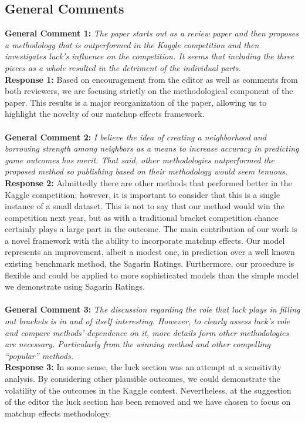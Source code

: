 \documentclass[11pt]{article} %
\begin{document}
\subsection*{General Comments}
{\bf General Comment 1:} \emph{The paper starts out as a review paper and then proposes a methodology that is outperformed in the Kaggle competition and then investigates luck's influence on the competition. It seems that including the three pieces as a whole resulted in the detriment of the individual parts.}\\
{\bf Response 1:} Based on encouragement from the editor as well as comments from both reviewers, we are focusing strictly on the methodological component of the paper. This results is a major reorganization of the paper, allowing us to highlight the novelty of our matchup effects framework.\\
\\
{\bf General Comment 2:} \emph{I believe the idea of creating a neighborhood and borrowing strength among neighbors as a means to increase accuracy in predicting game outcomes has merit. That said, other methodologies outperformed the proposed method so publishing based on their methodology would seem tenuous.}\\
{\bf Response 2:} Admittedly there are other methods that performed better in the Kaggle competition; however, it is important to consider that this is a single instance of a small dataset. This is not to say that our method would win the competition next year, but as with a traditional bracket competition chance certainly plays a large part in the outcome. The main contribution of our work is a novel framework with the ability to incorporate matchup effects. Our model represents an improvement, albeit a modest one, in prediction over a well known existing benchmark method, the Sagarin Ratings. Furthermore, our procedure is flexible and could be applied to more sophisticated models than the simple model we demonstrate using Sagarin Ratings.  \\
\\
{\bf General Comment 3:} \emph{The discussion regarding the role that luck plays in filling out brackets is in and of itself interesting. However, to clearly assess luck's role and compare methods' dependence on it, more details form other methodologies are necessary. Particularly from the winning method and other compelling ``popular'' methods.}\\
{\bf Response 3:} In some sense, the luck section was an attempt at a sensitivity analysis. By considering other plausible outcomes, we could demonstrate the volatility of the outcomes in the Kaggle contest. Nevertheless, at the suggestion of the editor the luck section has been removed and we have chosen to focus on matchup effects methodology.\\
\end{document}
